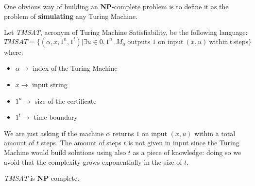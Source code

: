 One obvious way of building an \textbf{NP}-complete problem is to define it as the problem of \textbf{simulating} any Turing Machine. \vspace{7pt}

Let \textit{TMSAT}, acronym of Turing Machine Satisfiability, be the following language:
$$\textit{TMSAT} = \{(\alpha, x, 1^n, 1^t) | \exists u \in {0,1}^n \ .M_{\alpha} \ \text{outputs 1 on input} \ (x,u) \ \text{within} \ t \ \text{steps}\}$$
where:
\begin{itemize}
    \renewcommand{\labelitemi}{-}
    \item $\alpha \rightarrow$ index of the Turing Machine
    \item $x \rightarrow$ input string
    \item $1^n \rightarrow$ size of the certificate
    \item $1^t \rightarrow$ time boundary 
\end{itemize}
We are just asking if the machine $\alpha$ returns $1$ on input $(x,u)$ within a total amount of $t$ steps. The amount of steps $t$ is not given in input since 
the Turing Machine would build solutions using also $t$ as a piece of knowledge: doing so we avoid that the complexity grows exponentially in the size 
of $t$.
\begin{definition}[title = Theorem]
    \textit{TMSAT} is \textbf{NP}-complete.
\end{definition} 